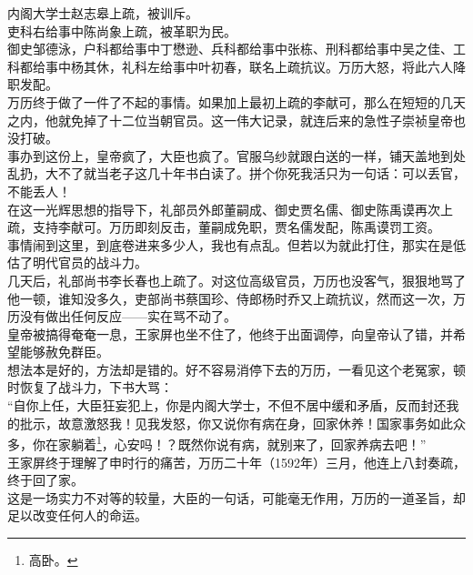 \begin{multicols}{\theparacolNo}
内阁大学士赵志皋上疏，被训斥。\\

吏科右给事中陈尚象上疏，被革职为民。\\

御史邹德泳，户科都给事中丁懋逊、兵科都给事中张栋、刑科都给事中吴之佳、工科都给事中杨其休，礼科左给事中叶初春，联名上疏抗议。万历大怒，将此六人降职发配。\\

万历终于做了一件了不起的事情。如果加上最初上疏的李献可，那么在短短的几天之内，他就免掉了十二位当朝官员。这一伟大记录，就连后来的急性子崇祯皇帝也没打破。\\

事办到这份上，皇帝疯了，大臣也疯了。官服乌纱就跟白送的一样，铺天盖地到处乱扔，大不了就当老子这几十年书白读了。拼个你死我活只为一句话：可以丢官，不能丢人！\\

在这一光辉思想的指导下，礼部员外郎董嗣成、御史贾名儒、御史陈禹谟再次上疏，支持李献可。万历即刻反击，董嗣成免职，贾名儒发配，陈禹谟罚工资。\\

事情闹到这里，到底卷进来多少人，我也有点乱。但若以为就此打住，那实在是低估了明代官员的战斗力。\\

几天后，礼部尚书李长春也上疏了。对这位高级官员，万历也没客气，狠狠地骂了他一顿，谁知没多久，吏部尚书蔡国珍、侍郎杨时乔又上疏抗议，然而这一次，万历没有做出任何反应——实在骂不动了。\\

皇帝被搞得奄奄一息，王家屏也坐不住了，他终于出面调停，向皇帝认了错，并希望能够赦免群臣。\\

想法本是好的，方法却是错的。好不容易消停下去的万历，一看见这个老冤家，顿时恢复了战斗力，下书大骂：\\

“自你上任，大臣狂妄犯上，你是内阁大学士，不但不居中缓和矛盾，反而封还我的批示，故意激怒我！见我发怒，你又说你有病在身，回家休养！国家事务如此众多，你在家躺着\footnote{高卧。}，心安吗！？既然你说有病，就别来了，回家养病去吧！”\\

王家屏终于理解了申时行的痛苦，万历二十年（1592年）三月，他连上八封奏疏，终于回了家。\\

这是一场实力不对等的较量，大臣的一句话，可能毫无作用，万历的一道圣旨，却足以改变任何人的命运。\\


\end{multicols}
